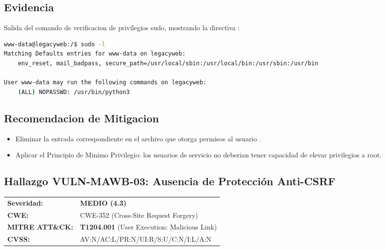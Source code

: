 \documentclass[a4paper]{article}
\newcommand{\maquinaID}{MAWB} %
\begin{document}
\subsection*{Evidencia}
Salida del comando de verificacion de privilegios sudo, mostrando la directiva :

\begin{lstlisting}[language=bash, caption=Verificacion de permisos sudo]
www-data@legacyweb:/$ sudo -l
Matching Defaults entries for www-data on legacyweb:
    env_reset, mail_badpass, secure_path=/usr/local/sbin:/usr/local/bin:/usr/sbin:/usr/bin

User www-data may run the following commands on legacyweb:
    (ALL) NOPASSWD: /usr/bin/python3
\end{lstlisting}

\subsection*{Recomendacion de Mitigacion}
\begin{itemize}
    \item Eliminar la entrada correspondiente en el archivo  que otorga permisos al usuario .
    \item Aplicar el Principio de Minimo Privilegio: los usuarios de servicio no deberian tener capacidad de elevar privilegios a root.
\end{itemize}

\clearpage

\subsection{Hallazgo VULN-\maquinaID-03: Ausencia de Protección Anti-CSRF}

\begin{tcolorbox}[colback=white, colframe=riskMedium, title=\textbf{Hallazgo VULN-\maquinaID-03: Ausencia de Protección Anti-CSRF}]
    \begin{tabularx}{\textwidth}{lX}

        \textbf{Severidad:} & 
        \textcolor{riskMedium}{\textbf{MEDIO (4.3)}} \\

        \textbf{CWE:} & 
        CWE-352 (Cross-Site Request Forgery) \\

        \textbf{MITRE ATT\&CK:} & 
        \textbf{T1204.001} (User Execution: Malicious Link) \\

        \textbf{CVSS:} & 
        AV:N/AC:L/PR:N/UI:R/S:U/C:N/I:L/A:N \\
    \end{tabularx}
\end{tcolorbox}
\end{document}
